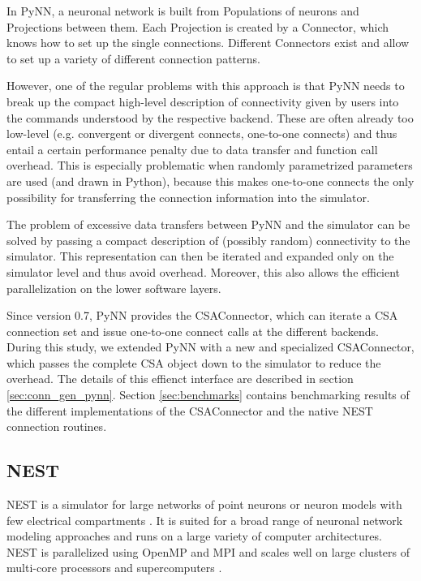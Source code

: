 \documentclass{frontiersSCNS} %
\begin{document}
In PyNN, a neuronal network is built from Populations of neurons and
Projections between them. Each Projection is created by a Connector,
which knows how to set up the single connections. Different Connectors
exist and allow to set up a variety of different connection patterns.

However, one of the regular problems with this approach is that PyNN
needs to break up the compact high-level description of connectivity
given by users into the commands understood by the respective
backend. These are often already too low-level (e.g. convergent or
divergent connects, one-to-one connects) and thus entail a certain
performance penalty due to data transfer and function call
overhead. This is especially problematic when randomly parametrized
parameters are used (and drawn in Python), because this makes
one-to-one connects the only possibility for transferring the
connection information into the simulator.

The problem of excessive data transfers between PyNN and the simulator
can be solved by passing a compact description of (possibly random)
connectivity to the simulator. This representation can then be
iterated and expanded only on the simulator level and thus avoid
overhead. Moreover, this also allows the efficient parallelization on
the lower software layers.

Since version 0.7, PyNN provides the CSAConnector, which can iterate a
CSA connection set and issue one-to-one connect calls at the different
backends. During this study, we extended PyNN with a new and
specialized CSAConnector, which passes the complete CSA object down to
the simulator to reduce the overhead. The details of this effienct
interface are described in section \ref{sec:conn_gen_pynn}. Section
\ref{sec:benchmarks} contains benchmarking results of the different
implementations of the CSAConnector and the native NEST connection
routines.

\subsection{NEST}

NEST is a simulator for large networks of point neurons or neuron
models with few electrical compartments
\citep[http://www.nest-initiative.org;][]{Gewaltig_07_11204}. It is
suited for a broad range of neuronal network modeling approaches and
runs on a large variety of computer architectures. NEST is
parallelized using OpenMP \citep{OpenMPSpec} and MPI
\citep{MPIForum94} and scales well on large clusters of multi-core
processors and supercomputers \citep{Helias12_26}.
\end{document}
